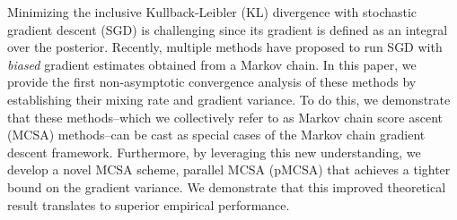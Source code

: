 
Minimizing the inclusive Kullback-Leibler (KL) divergence with stochastic gradient descent (SGD) is challenging since its gradient is defined as an integral over the posterior.
Recently, multiple methods have proposed to run SGD with \textit{biased} gradient estimates obtained from a Markov chain.
In this paper, we provide the first non-asymptotic convergence analysis of these methods by establishing their mixing rate and gradient variance.
To do this, we demonstrate that these methods--which we collectively refer to as Markov chain score ascent (MCSA) methods--can be cast as special cases of the Markov chain gradient descent framework.
Furthermore, by leveraging this new understanding, we develop a novel MCSA scheme, parallel MCSA (pMCSA) that achieves a tighter bound on the gradient variance.
We demonstrate that this improved theoretical result translates to superior empirical performance.



